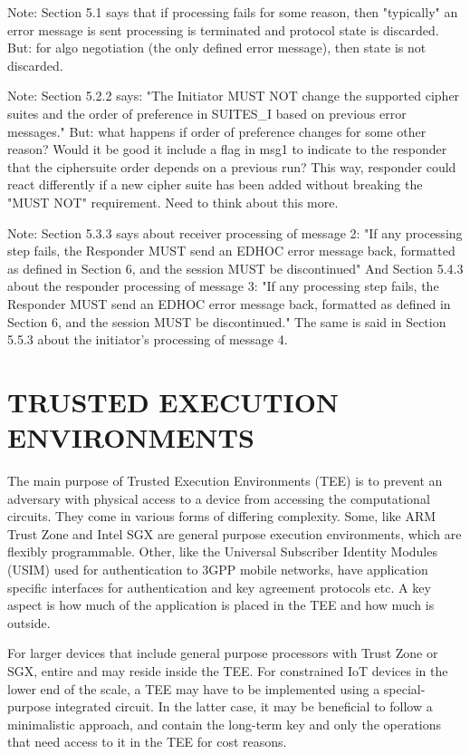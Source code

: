 \documentclass[runningheads]{llncs}
\begin{document}
Note: Section 5.1 says that if processing fails for some reason,
then "typically" an error message is sent processing is terminated and protocol
state is discarded. But: for algo negotiation (the only defined error
message), then state is not discarded.

Note: Section 5.2.2 says:
"The Initiator MUST NOT change the supported cipher suites and
the order of preference in SUITES\_I based on previous error messages."
But: what happens if order of preference changes for some other reason? Would it
be good it include a flag in msg1 to indicate to the responder that the
ciphersuite order depends on a previous run? This way, responder could react
differently if a new cipher suite has been added without breaking the "MUST NOT"
requirement. Need to think about this more.

Note: Section 5.3.3 says about receiver processing of message 2:
"If any processing step fails,
the Responder MUST send an EDHOC error message back, formatted as defined in
Section 6, and the session MUST be discontinued"
And Section 5.4.3 about the responder processing of message 3:
"If any processing step fails, the Responder MUST send an EDHOC error
message back, formatted as defined in Section 6, and the session MUST
be discontinued."
The same is said in Section 5.5.3 about the initiator's processing of message 4.

\section{\uppercase{Trusted Execution Environments}}
\label{sec:TEE}
The main purpose of Trusted Execution Environments (TEE) is to prevent an
adversary with physical access to a device from accessing the computational
circuits.
%
They come in various forms of differing complexity.
%
Some, like ARM Trust Zone and Intel SGX are general purpose execution
environments, which are flexibly programmable.
%
Other, like the Universal Subscriber Identity Modules (USIM) used for
authentication to 3GPP mobile networks, have application specific interfaces for
authentication and key agreement protocols etc.
%
A key aspect is how much of the application is placed in the TEE and how much is
outside.
%

For larger devices that include general purpose processors with Trust Zone or
SGX, entire \mEdhoc{} and \mOscore{} may reside inside the TEE.
%
For constrained IoT devices in the lower end of the scale, a TEE may have to be
implemented using a special-purpose integrated circuit.
%
In the latter case, it may be beneficial to follow a minimalistic approach, and
contain the long-term key and only
the operations that need access to it in the TEE for cost reasons.
%
\end{document}
